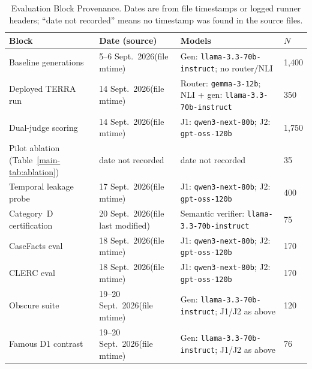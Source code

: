 \par\begingroup
  
  \small
  
  
  \begin{longtable}{@{}p{3.8cm}p{2.2cm}p{5.2cm}p{1.4cm}@{}}
\caption{Evaluation Block Provenance. Dates are from file timestamps or
           logged runner headers; ``date not recorded'' means no timestamp
           was found in the source files.}\label{tab:run_provenance}\\
    \toprule
    \textbf{Block} & \textbf{Date (source)} & \textbf{Models} & \textbf{$N$} \\
    \midrule
    Baseline generations & 5--6 Sept.\ 2026\newline (file mtime) &
      Gen: \texttt{llama-3.3-70b-instruct}; no router/NLI &
      1,400 \\
    \addlinespace
    Deployed TERRA run & 14 Sept.\ 2026\newline (file mtime) &
      Router: \texttt{gemma-3-12b}; NLI + gen: \texttt{llama-3.3-70b-instruct} &
      350 \\
    \addlinespace
    Dual-judge scoring & 14 Sept.\ 2026\newline (file mtime) &
      J1: \texttt{qwen3-next-80b}; J2: \texttt{gpt-oss-120b} &
      1,750 \\
    \addlinespace
    Pilot ablation (Table~\ref{main-tab:ablation}) & date not recorded &
      date not recorded & 35 \\
    \addlinespace
    Temporal leakage probe & 17 Sept.\ 2026\newline (file mtime) &
      J1: \texttt{qwen3-next-80b}; J2: \texttt{gpt-oss-120b} & 400 \\
    \addlinespace
    Category~D certification & 20 Sept.\ 2026\newline (file last modified) &
      Semantic verifier: \texttt{llama-3.3-70b-instruct} & 75 \\
    \addlinespace
    CaseFacts eval & 18 Sept.\ 2026\newline (file mtime) &
      J1: \texttt{qwen3-next-80b}; J2: \texttt{gpt-oss-120b} & 170 \\
    \addlinespace
    CLERC eval & 18 Sept.\ 2026\newline (file mtime) &
      J1: \texttt{qwen3-next-80b}; J2: \texttt{gpt-oss-120b} & 170 \\
    \addlinespace
    Obscure suite & 19--20 Sept.\ 2026\newline (file mtime) &
      Gen: \texttt{llama-3.3-70b-instruct}; J1/J2 as above &
      120 \\
    \addlinespace
    Famous D1 contrast & 19--20 Sept.\ 2026\newline (file mtime) &
      Gen: \texttt{llama-3.3-70b-instruct}; J1/J2 as above &
      76 \\
    \bottomrule
  \end{longtable}
\par\endgroup
